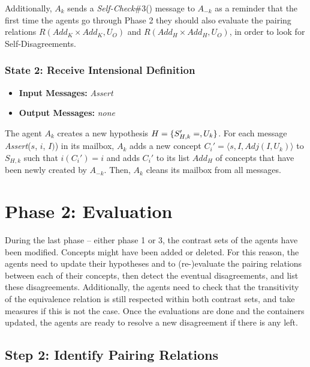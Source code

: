Additionally, $A_{k}$ sends a \emph{Self-Check}\#3() message to $A_{-k}$ as a reminder that the first time the agents go through Phase 2 they should also evaluate the pairing relations $R(Add_{K} \times Add_{K}, U_{O})$ and $R(Add_{H} \times Add_{H}, U_{O})$, in order to look for Self-Disagreements.

\subsubsection{State 2: Receive Intensional Definition}

\begin{itemize}
    \item \textbf{Input Messages:} \emph{Assert}
    \item \textbf{Output Messages:} \emph{none}
\end{itemize}

The agent $A_{k}$ creates a new hypothesis $H = \{ S'_{H,k} = \empty, U_{k} \}$. For each message \emph{Assert}($s$, $i$, $I)$) in its mailbox, $A_{k}$ adds a new concept $C_{i}' = \langle s, I, Adj(I, U_{k}) \rangle$ to $S_{H,k}$ such that $i(C_{i}') = i$ and adds $C_{i}'$ to its list $Add_{H}$ of concepts that have been newly created by $A_{-k}$. Then, $A_{k}$ cleans its mailbox from all messages. 

\section{Phase 2: Evaluation}

During the last phase -- either phase 1 or 3, the contrast sets of the agents have been modified. Concepts might have been added or deleted. For this reason, the agents need to update their hypotheses and to (re-)evaluate the pairing relations between each of their concepts, then detect the eventual disagreements, and list these disagreements. Additionally, the agents need to check that the transitivity of the equivalence relation is still respected within both contrast sets, and take measures if this is not the case. Once the evaluations are done and the containers updated, the agents are ready to resolve a new disagreement if there is any left.

\subsection{Step 2: Identify Pairing Relations}

